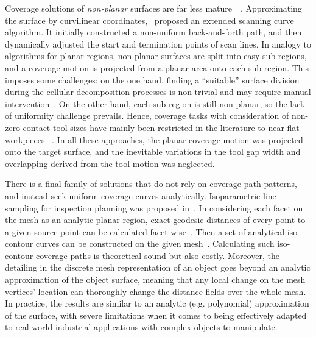 \documentclass[lettersize,journal]{IEEEtran}
\begin{document}
Coverage solutions of  \textit{non-planar} surfaces are far less mature~\cite{Chen2009Review}~\cite{Huo2021Robotic}. 
Approximating the surface by curvilinear coordinates,~\cite{Tam1999Toward} proposed an extended scanning curve algorithm. It initially constructed a non-uniform back-and-forth path, and then dynamically adjusted the start and termination points of scan lines. 
In analogy to algorithms for planar regions, non-planar surfaces are split into easy sub-regions, and a coverage motion is projected from a planar area onto each sub-region. 
This imposes some challenges: on the one hand, finding a ``suitable'' surface division during the cellular decomposition processes is non-trivial and may require manual intervention~\cite{Zhou2016Sweep}. 
On the other hand, each sub-region is still non-planar, so the lack of uniformity challenge prevails. 
Hence, coverage tasks with consideration of non-zero contact tool sizes have mainly been restricted in the literature to near-flat workpieces ~\cite{Bhatt2020Incorporating}. 
In all these approaches, the planar coverage motion was projected onto the target surface, and the inevitable variations in the tool gap width and 
overlapping derived from the tool motion was neglected. 

There is a final family of solutions that do not rely on coverage path patterns, and instead seek uniform coverage curves analytically. 
Isoparametric line sampling for inspection planning was proposed in~\cite{Elkott2005Isoparametric}. 
In considering each facet on the mesh as an analytic planar region, exact geodesic distances of every point to a given source point can be calculated facet-wise~\cite{Liu2010Construction}. 
Then a set of analytical iso-contour curves can be constructed on the given mesh~\cite{Wu2019Energy}. 
Calculating such iso-contour coverage paths is theoretical sound but also costly. Moreover, the detailing in the discrete mesh representation of an object goes beyond 
an analytic approximation of the object surface, meaning that any local change on the mesh vertices' location can thoroughly change the distance fields over the whole mesh.
In practice, the results are similar to an analytic (e.g. polynomial) approximation of the surface, with severe limitations when it comes to being effectively adapted to real-world industrial applications with complex objects to manipulate. 
\end{document}
